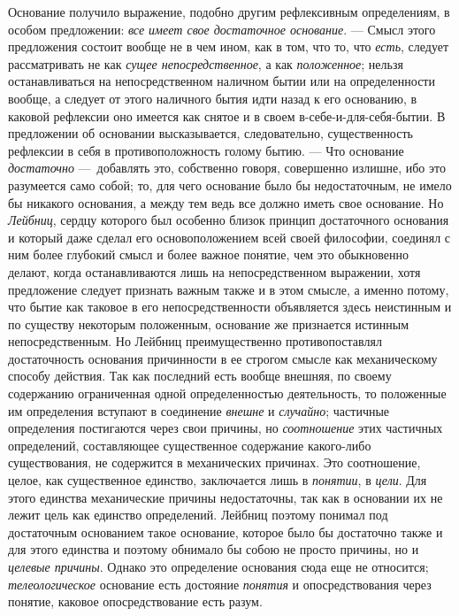 Основание получило выражение, подобно другим рефлексивным определениям, в
особом предложении: {\em все имеет свое достаточное
основание}. — Смысл этого предложения состоит вообще не в чем ином, как в
том, что то, что {\em есть}, следует рассматривать не
как {\em сущее непосредственное}, а как
{\em положенное}; нельзя останавливаться на
непосредственном наличном бытии или на определенности вообще, а следует от
этого наличного бытия идти назад к его основанию, в каковой рефлексии оно
имеется как снятое и в своем в-себе-и-для-себя-бытии. В предложении об
основании высказывается, следовательно, существенность рефлексии в себя в
противоположность голому бытию. — Что основание
{\em достаточно} —~добавлять это, собственно говоря,
совершенно излишне, ибо это разумеется само собой; то, для чего основание
было бы недостаточным, не имело бы никакого основания, а между тем ведь все
должно иметь свое основание. Но {\em Лейбниц}, сердцу
которого был особенно близок принцип достаточного основания и который даже
сделал его основоположением всей своей философии, соединял с ним более
глубокий смысл и более важное понятие, чем это обыкновенно делают, когда
останавливаются лишь на непосредственном выражении, хотя предложение
следует признать важным также и в этом смысле, а именно потому, что бытие
как таковое в его непосредственности объявляется здесь неистинным и по
существу некоторым положенным, основание же признается истинным
непосредственным. Но Лейбниц преимущественно противопоставлял достаточность
основания причинности в ее строгом смысле как механическому способу
действия. Так как последний есть вообще внешняя, по своему содержанию
ограниченная одной определенностью деятельность, то положенные им
определения вступают в соединение {\em внешне} и
{\em случайно}; частичные определения постигаются через
свои причины, но {\em соотношение} этих частичных
определений, составляющее существенное содержание какого-либо
существования, не содержится в механических причинах. Это соотношение,
целое, как существенное единство, заключается лишь в
{\em понятии}, в {\em цели}. Для
этого единства механические причины недостаточны, так как в основании их не
лежит цель как единство определений. Лейбниц поэтому понимал под
достаточным основанием такое основание, которое было бы достаточно также и
для этого единства и поэтому обнимало бы собою не просто причины, но и
{\em целевые причины}. Однако это определение основания
сюда еще не относится; {\em телеологическое} основание
есть достояние {\em понятия} и опосредствования через
понятие, каковое опосредствование есть разум.


